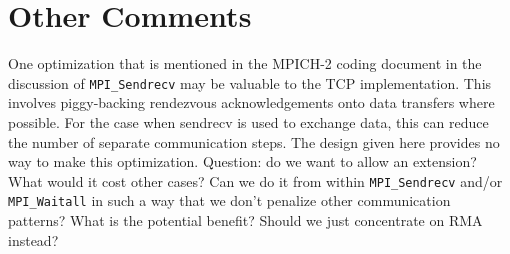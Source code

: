 \documentclass{article}
\def\code{\begingroup\makeustext\eatcode}
\def\eatcode#1{\texttt{#1}\endgroup}
\begin{document}
\section{Other Comments}
One optimization that is mentioned in the MPICH-2 coding document
\cite{mpich2} in the discussion of \code{MPI_Sendrecv} may be valuable
to the TCP implementation.  This involves piggy-backing rendezvous
acknowledgements onto data transfers where possible.  For the case
when sendrecv is used to exchange data, this can reduce the number of
separate communication steps.  The design given here provides no way
to make this optimization.  Question: do we want to allow an
extension?  What would it cost other cases?  Can we do it from within
\code{MPI_Sendrecv} and/or \code{MPI_Waitall} in such a way that we
don't penalize other communication patterns?  What is the potential
benefit?  Should we just concentrate on RMA instead?
\end{document}
